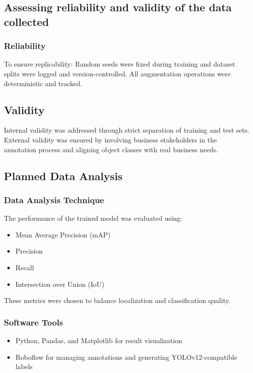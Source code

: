 \documentclass[a4paper,10pt,twocolumn]{article}
\numberwithin{figure}{section}
\numberwithin{table}{section}
\begin{document}
\subsection{Assessing reliability and validity of the data collected}

\subsubsection{Reliability}
To ensure replicability:
Random seeds were fixed during training and 
dataset splits were logged and version-controlled. 
All augmentation operations were deterministic and tracked.

\subsection{Validity}
Internal validity was addressed through strict separation 
of training and test sets. External validity was ensured 
by involving business stakeholders in the annotation 
process and aligning object classes with 
real business needs.


\subsection{Planned Data Analysis}

\subsubsection{Data Analysis Technique}
The performance of the trained model was evaluated using:
\begin{itemize} 
    \item Mean Average Precision (mAP)
    \item Precision
    \item Recall
    \item Intersection over Union (IoU)
\end{itemize} 
These metrics were chosen to balance 
localization and classification quality.

\subsubsection{Software Tools}

\begin{itemize} 
    \item Python, Pandas, and Matplotlib for result visualization
    \item Roboflow for managing annotations and generating YOLOv12-compatible labels
\end{itemize} 
\end{document}
